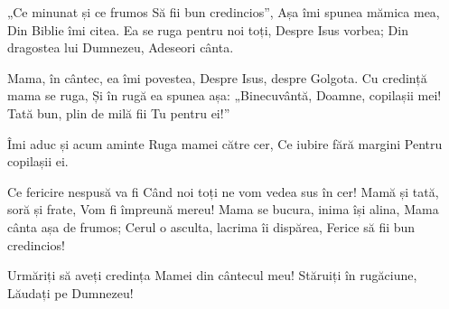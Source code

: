 \beginverse
„Ce minunat și ce frumos
Să fii bun credincios”,
Așa îmi spunea mămica mea,
Din Biblie îmi citea.
Ea se ruga pentru noi toți,
Despre Isus vorbea;
Din dragostea lui Dumnezeu,
Adeseori cânta.
\endverse

\beginchorus
Mama, în cântec, ea îmi povestea,
Despre Isus, despre Golgota.
Cu credință mama se ruga,
Și în rugă ea spunea așa:
„Binecuvântă, Doamne, copilașii mei!
Tată bun, plin de milă fii Tu pentru ei!”
\endchorus

\beginverse*
Îmi aduc și acum aminte
Ruga mamei către cer,
Ce iubire fără margini
Pentru copilașii ei.
\endverse

\beginverse
Ce fericire nespusă va fi
Când noi toți ne vom vedea sus în cer!
Mamă și tată, soră și frate,
Vom fi împreună mereu!
Mama se bucura, inima își alina,
Mama cânta așa de frumos;
Cerul o asculta, lacrima îi dispărea,
Ferice să fii bun credincios!
\endverse

\beginverse*
Urmăriți să aveți credința
Mamei din cântecul meu!
Stăruiți în rugăciune,
Lăudați pe Dumnezeu!
\endverse
\endsong